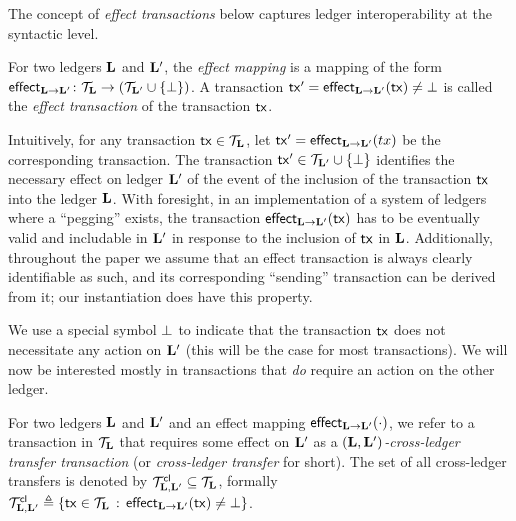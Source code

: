 The concept of {\em effect transactions} below captures ledger interoperability
at the syntactic level.

\begin{definition}
\label{def:effect}
For two ledgers $\mathbf{L}$ and $\mathbf{L}'$, the \emph{effect mapping} is a
mapping of the form
$
  \mathsf{effect}_{\mathbf{L}\rightarrow \mathbf{L}'}
\colon
\mathcal{T}_{\mathbf{L}}
\to
\left(
  \mathcal{T}_{\mathbf{L}'}
  \cup
  \{\bot\}
\right)
$.
  A transaction $ \mathsf{tx}'=\mathsf{effect}_{\mathbf{L}\rightarrow \mathbf{L}'}(\mathsf{tx}) \neq \bot$ is called the \emph{effect
transaction} of the transaction $\mathsf{tx}$.
\end{definition}

Intuitively, for any transaction $\mathsf{tx}\in\mathcal{T}_{\mathbf{L}}$, let $\mathsf{tx}' = \mathsf{effect}_{\mathbf{L}\rightarrow \mathbf{L}'}(tx)$ be the corresponding transaction. The transaction $\mathsf{tx}' \in \mathcal{T}_{\mathbf{L}'}\cup\{\bot\}$ identifies
the necessary effect on ledger $\mathbf{L}'$ of the  event of the inclusion of the transaction $\mathsf{tx}$ into the ledger
$\mathbf{L}$. With foresight, in an implementation of a  system of ledgers where a ``pegging''   exists, the transaction
$\mathsf{effect}_{\mathbf{L}\rightarrow \mathbf{L}'}(\mathsf{tx})$ has to be eventually valid and includable in
$\mathbf{L}'$ in response to the inclusion of $\mathsf{tx}$ in $\mathbf{L}$.
Additionally, throughout the paper we assume that an effect transaction is
always clearly identifiable as such, and its corresponding ``sending''
transaction can be derived from it; our instantiation does have this property.


We use a special symbol $\bot$ to indicate that the transaction $\mathsf{tx}$ does
not necessitate any action on $\mathbf{L}'$ (this will be the case for most
transactions).
We will now be interested mostly in transactions that \emph{do}
require an action on the other ledger.

\begin{definition}
For two ledgers $\mathbf{L}$ and $\mathbf{L}'$ and an effect mapping
$\mathsf{effect}_{\mathbf{L}\rightarrow \mathbf{L}'}(\cdot)$, we refer to a transaction in
$\mathcal{T}_{\mathbf{L}}$ that requires some effect on $\mathbf{L}'$ as
a \emph{$(\mathbf{L},\mathbf{L}')$-cross-ledger transfer
transaction} (or \emph{cross-ledger transfer} for short).
The set of all cross-ledger transfers is denoted by
  $\mathcal{T}_{\mathbf{L},\mathbf{L}'}^{\mathsf{cl}}\subseteq\mathcal{T}_{\mathbf{L}}$,
formally
$
  \mathcal{T}_{\mathbf{L},\mathbf{L}'}^{\mathsf{cl}}
\triangleq
\left\{ \mathsf{tx} \in \mathcal{T}_{\mathbf{L}} \,:\, \mathsf{effect}_{\mathbf{L}\rightarrow \mathbf{L}'}(\mathsf{tx})\neq\bot \right\}
$.
\end{definition}

